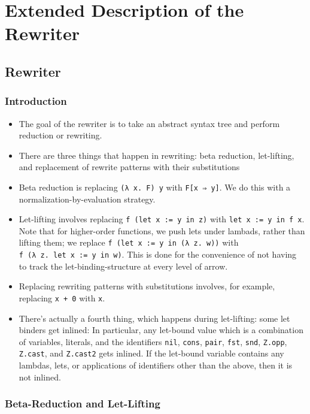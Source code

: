 \chapter{Extended Description of the Rewriter}
\section{Rewriter}\label{rewriter}

\subsection{Introduction}\label{introduction}

\begin{itemize}
\tightlist
\item
  The goal of the rewriter is to take an abstract syntax tree and
  perform reduction or rewriting.
\item
  There are three things that happen in rewriting: beta reduction,
  let-lifting, and replacement of rewrite patterns with their
  substitutions
\item
  Beta reduction is replacing \texttt{(λ\ x.\ F)\ y} with
  \texttt{F{[}x\ ⇒\ y{]}}. We do this with a normalization-by-evaluation
  strategy.
\item
  Let-lifting involves replacing \texttt{f\ (let\ x\ :=\ y\ in\ z)} with
  \texttt{let\ x\ :=\ y\ in\ f\ x}. Note that for higher-order
  functions, we push lets under lambads, rather than lifting them; we
  replace \texttt{f\ (let\ x\ :=\ y\ in\ (λ\ z.\ w))} with
  \texttt{f\ (λ\ z.\ let\ x\ :=\ y\ in\ w)}. This is done for the
  convenience of not having to track the let-binding-structure at every
  level of arrow.
\item
  Replacing rewriting patterns with substitutions involves, for example,
  replacing \texttt{x\ +\ 0} with \texttt{x}.
\item
  There's actually a fourth thing, which happens during let-lifting:
  some let binders get inlined: In particular, any let-bound value which
  is a combination of variables, literals, and the identifiers
  \texttt{nil}, \texttt{cons}, \texttt{pair}, \texttt{fst},
  \texttt{snd}, \texttt{Z.opp}, \texttt{Z.cast}, and \texttt{Z.cast2}
  gets inlined. If the let-bound variable contains any lambdas, lets, or
  applications of identifiers other than the above, then it is not
  inlined.
\end{itemize}

\subsection{Beta-Reduction and
Let-Lifting}\label{beta-reduction-and-let-lifting}

